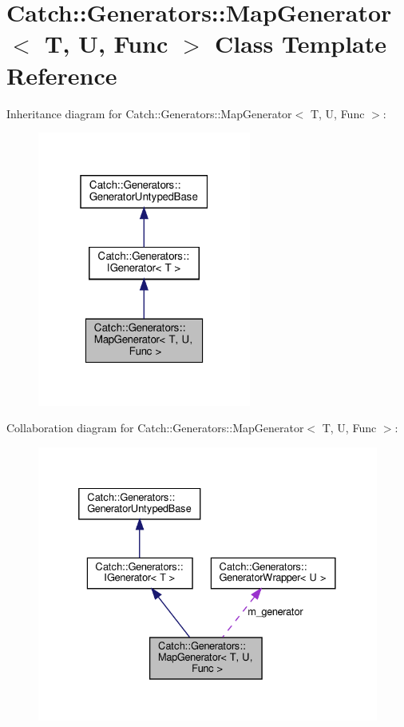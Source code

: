 \hypertarget{classCatch_1_1Generators_1_1MapGenerator}{}\section{Catch\+:\+:Generators\+:\+:Map\+Generator$<$ T, U, Func $>$ Class Template Reference}
\label{classCatch_1_1Generators_1_1MapGenerator}


Inheritance diagram for Catch\+:\+:Generators\+:\+:Map\+Generator$<$ T, U, Func $>$\+:
\nopagebreak
\begin{figure}[H]
\begin{center}
\leavevmode
\includegraphics[width=199pt]{classCatch_1_1Generators_1_1MapGenerator__inherit__graph}
\end{center}
\end{figure}


Collaboration diagram for Catch\+:\+:Generators\+:\+:Map\+Generator$<$ T, U, Func $>$\+:
\nopagebreak
\begin{figure}[H]
\begin{center}
\leavevmode
\includegraphics[width=332pt]{classCatch_1_1Generators_1_1MapGenerator__coll__graph}
\end{center}
\end{figure}
